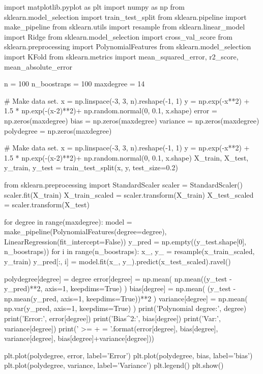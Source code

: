 \documentclass[%
oneside,                 %
final,                   %
10pt]{article}
\begin{document}
\begin{print}

import matplotlib.pyplot as plt
import numpy as np
from sklearn.model_selection import train_test_split
from sklearn.pipeline import make_pipeline
from sklearn.utils import resample
from sklearn.linear_model import Ridge
from sklearn.model_selection import cross_val_score
from sklearn.preprocessing import PolynomialFeatures
from sklearn.model_selection import KFold
from sklearn.metrics import mean_squared_error, r2_score, mean_absolute_error

n = 100
n_boostraps = 100
maxdegree = 14

# Make data set.
x = np.linspace(-3, 3, n).reshape(-1, 1)
y = np.exp(-x**2) + 1.5 * np.exp(-(x-2)**2)+ np.random.normal(0, 0.1, x.shape)
error = np.zeros(maxdegree)
bias = np.zeros(maxdegree)
variance = np.zeros(maxdegree)
polydegree = np.zeros(maxdegree)


# Make data set.
x = np.linspace(-3, 3, n).reshape(-1, 1)
y = np.exp(-x**2) + 1.5 * np.exp(-(x-2)**2)+ np.random.normal(0, 0.1, x.shape)
X_train, X_test, y_train, y_test = train_test_split(x, y, test_size=0.2)

from sklearn.preprocessing import StandardScaler
scaler = StandardScaler()
scaler.fit(X_train)
X_train_scaled = scaler.transform(X_train)
X_test_scaled = scaler.transform(X_test)

for degree in range(maxdegree):
    model = make_pipeline(PolynomialFeatures(degree=degree), LinearRegression(fit_intercept=False))
    y_pred = np.empty((y_test.shape[0], n_boostraps))
    for i in range(n_boostraps):
        x_, y_ = resample(x_train_scaled, y_train)
        y_pred[:, i] = model.fit(x_, y_).predict(x_test_scaled).ravel()

    polydegree[degree] = degree
    error[degree] = np.mean( np.mean((y_test - y_pred)**2, axis=1, keepdims=True) )
    bias[degree] = np.mean( (y_test - np.mean(y_pred, axis=1, keepdims=True))**2 )
    variance[degree] = np.mean( np.var(y_pred, axis=1, keepdims=True) )
    print('Polynomial degree:', degree)
    print('Error:', error[degree])
    print('Bias^2:', bias[degree])
    print('Var:', variance[degree])
    print('{} >= {} + {} = {}'.format(error[degree], bias[degree], variance[degree], bias[degree]+variance[degree]))

plt.plot(polydegree, error, label='Error')
plt.plot(polydegree, bias, label='bias')
plt.plot(polydegree, variance, label='Variance')
plt.legend()
plt.show()



\end{print}



\end{document}
